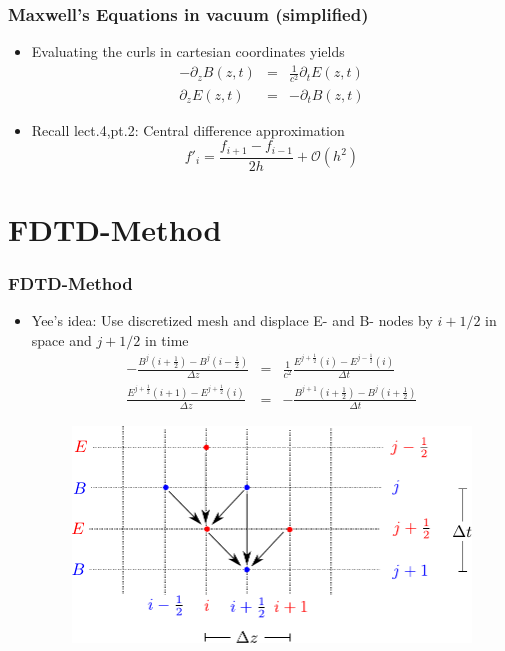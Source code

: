 \documentclass[ignorenonframetext]{beamer}
\begin{document}
\begin{frame}
\frametitle{Maxwell's Equations in vacuum (simplified)}
\begin{itemize}
\item Evaluating the curls in cartesian coordinates yields
\begin{eqnarray}
-\partial_z B(z, t) &=& \frac{1}{c^2} \partial_t E(z, t)\nonumber\\
\partial_z E(z, t)  &=& -\partial_t B(z, t)
\end{eqnarray}
\item Recall lect.4,pt.2: Central difference approximation
\begin{equation}
f'_i = \frac{f_{i+1} - f_{i-1}}{2h} + \mathcal{O}(h^2) 
\end{equation}
\end{itemize}
\end{frame}

\section{FDTD-Method}
\begin{frame}
\frametitle{FDTD-Method}
\begin{itemize}
\item Yee's idea: Use discretized mesh and displace E- and B- nodes by $i + 1/2$ in space and $j + 1/2$ in time 
\begin{eqnarray}
- \frac{B^{j}(i+\frac{1}{2}) - B^{j}(i-\frac{1}{2})}{\Delta z} &=& \frac{1}{c^2} \frac{E^{j+\frac{1}{2}}(i) - E^{j-\frac{1}{2}}(i)}{\Delta t}\nonumber\\
\frac{E^{j+\frac{1}{2}}(i + 1) - E^{j+\frac{1}{2}}(i)}{\Delta z} &=& -\frac{B^{j+1}(i+\frac{1}{2}) - B^{j}(i+\frac{1}{2})}{\Delta t} 
\end{eqnarray}
\begin{figure}
\centering
\includegraphics[width=0.7\linewidth]{yee_mesh}
\end{figure}

\end{itemize}
\end{frame}
\end{document}
